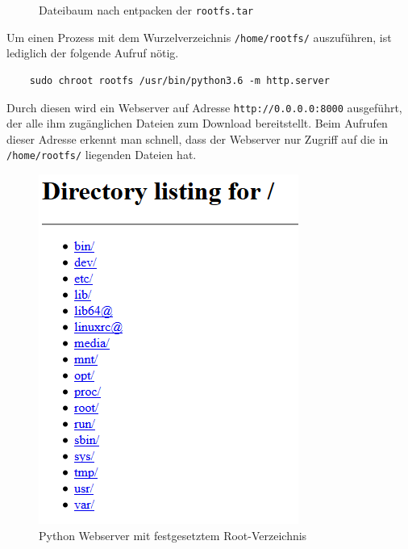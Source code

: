 \begin{figure}[h]
	\centering
	\begin{minipage}{0.9\textwidth}
	\end{minipage}
	\caption{Dateibaum nach entpacken der \texttt{rootfs.tar}}
	\label{fig:baumNachUntar}
\end{figure}

Um einen Prozess mit dem Wurzelverzeichnis \texttt{/home/rootfs/} auszuführen, ist lediglich der folgende Aufruf nötig.
\lstset{
	language=bash,
	caption=Shell-Commands um Python Webserver mit definierter Root zu starten
}
\begin{lstlisting}
	sudo chroot rootfs /usr/bin/python3.6 -m http.server
\end{lstlisting}

Durch diesen wird ein Webserver auf Adresse \texttt{http://0.0.0.0:8000} ausgeführt, der alle ihm zugänglichen Dateien zum Download bereitstellt. Beim Aufrufen dieser Adresse erkennt man schnell, dass der Webserver nur Zugriff auf die in \texttt{/home/rootfs/} liegenden Dateien hat.
\begin{figure}[h]
	\begin{center}
		\includegraphics[scale=0.8]{bilder/chroot-python-webserver.png}
		\caption{Python Webserver mit festgesetztem Root-Verzeichnis}
		\label{fig:chrootPythonWebserver}
	\end{center}
\end{figure}

